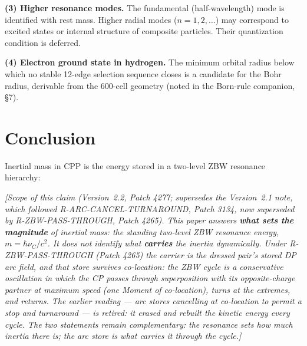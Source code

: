\documentclass[12pt]{article}
\newcommand{\nuC}{\nu_C}
\begin{document}
\textbf{(3) Higher resonance modes.}  The fundamental (half-wavelength)
mode is identified with rest mass.  Higher radial modes ($n =
1,2,\ldots$) may correspond to excited states or internal structure of
composite particles.  Their quantization condition is deferred.

\textbf{(4) Electron ground state in hydrogen.}  The minimum orbital radius
below which no stable 12-edge selection sequence closes is a candidate for
the Bohr radius, derivable from the 600-cell geometry (noted in the
Born-rule companion, \S7).

\section{Conclusion}
\label{sec:conclusion}

Inertial mass in CPP is the energy stored in a two-level ZBW resonance
hierarchy:

\emph{[Scope of this claim (Version~2.2, Patch 4277; supersedes the Version~2.1
note, which followed R-ARC-CANCEL-TURNAROUND, Patch 3134, now superseded by
R-ZBW-PASS-THROUGH, Patch 4265).
This paper answers \textbf{what sets the magnitude} of inertial mass: the
standing two-level ZBW resonance energy, $m = \hbar\nuC/c^2$. It does
\emph{not} identify what \textbf{carries} the inertia dynamically. Under
R-ZBW-PASS-THROUGH (Patch 4265) the carrier is the dressed pair's
\emph{stored DP arc field}, and that store \emph{survives} co-location: the
ZBW cycle is a conservative oscillation in which the CP passes through
superposition with its opposite-charge partner at maximum speed (one Moment
of co-location), turns at the extremes, and returns.  The earlier reading ---
arc stores cancelling at co-location to permit a stop and turnaround ---
is retired: it erased and rebuilt the kinetic energy every cycle.
The two statements remain complementary: the resonance sets how much inertia
there is; the arc store is what carries it through the cycle.]}
\end{document}
